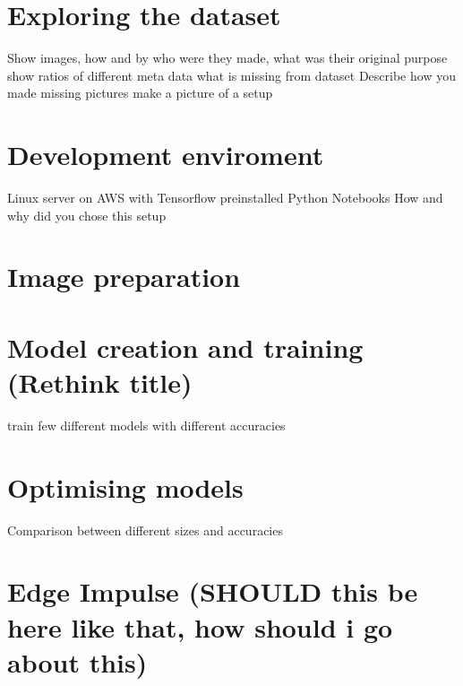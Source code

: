 \section{ Exploring the dataset}
Show images, 
how and by who were they made, 
what was their original purpose
show ratios of different meta data
what is missing from dataset
Describe how you made missing pictures
make a picture of a setup

\section{ Development enviroment }
Linux server on AWS with Tensorflow preinstalled
Python Notebooks
How and why did you chose this setup
\section{ Image preparation}

\section{ Model creation and training (Rethink title)}
train few different models
with different accuracies

\section{ Optimising models}
Comparison between different sizes and accuracies

\section{ Edge Impulse (SHOULD this be here like that, how should i go about this)}
